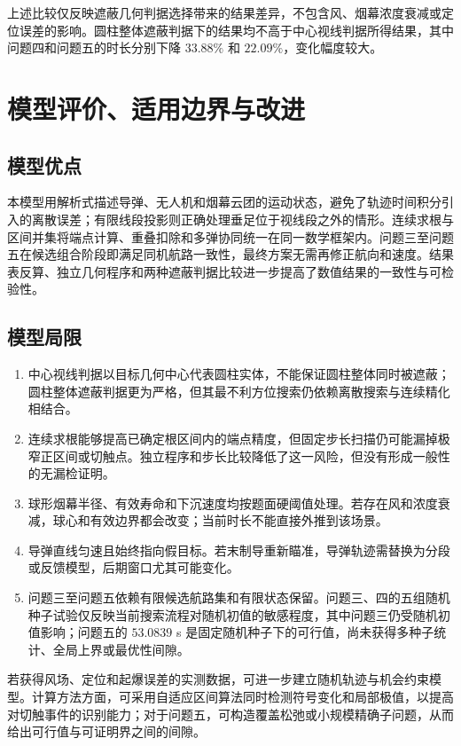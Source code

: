 \documentclass[UTF8,a4paper,12pt,fontset=windows]{ctexart}
\begin{document}
上述比较仅反映遮蔽几何判据选择带来的结果差异，不包含风、烟幕浓度衰减或定位误差的影响。圆柱整体遮蔽判据下的结果均不高于中心视线判据所得结果，其中问题四和问题五的时长分别下降 $33.88\%$ 和 $22.09\%$，变化幅度较大。

\section{模型评价、适用边界与改进}

\subsection{模型优点}

本模型用解析式描述导弹、无人机和烟幕云团的运动状态，避免了轨迹时间积分引入的离散误差；有限线段投影则正确处理垂足位于视线段之外的情形。连续求根与区间并集将端点计算、重叠扣除和多弹协同统一在同一数学框架内。问题三至问题五在候选组合阶段即满足同机航路一致性，最终方案无需再修正航向和速度。结果表反算、独立几何程序和两种遮蔽判据比较进一步提高了数值结果的一致性与可检验性。

\subsection{模型局限}

\begin{enumerate}
  \item 中心视线判据以目标几何中心代表圆柱实体，不能保证圆柱整体同时被遮蔽；圆柱整体遮蔽判据更为严格，但其最不利方位搜索仍依赖离散搜索与连续精化相结合。
  \item 连续求根能够提高已确定根区间内的端点精度，但固定步长扫描仍可能漏掉极窄正区间或切触点。独立程序和步长比较降低了这一风险，但没有形成一般性的无漏检证明。
  \item 球形烟幕半径、有效寿命和下沉速度均按题面硬阈值处理。若存在风和浓度衰减，球心和有效边界都会改变；当前时长不能直接外推到该场景。
  \item 导弹直线匀速且始终指向假目标。若末制导重新瞄准，导弹轨迹需替换为分段或反馈模型，后期窗口尤其可能变化。
  \item 问题三至问题五依赖有限候选航路集和有限状态保留。问题三、四的五组随机种子试验仅反映当前搜索流程对随机初值的敏感程度，其中问题三仍受随机初值影响；问题五的 $53.0839$ s 是固定随机种子下的可行值，尚未获得多种子统计、全局上界或最优性间隙。
\end{enumerate}

若获得风场、定位和起爆误差的实测数据，可进一步建立随机轨迹与机会约束模型。计算方法方面，可采用自适应区间算法同时检测符号变化和局部极值，以提高对切触事件的识别能力；对于问题五，可构造覆盖松弛或小规模精确子问题，从而给出可行值与可证明界之间的间隙。
\end{document}
